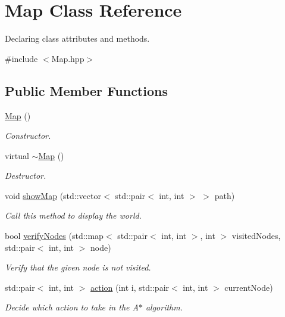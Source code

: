 \hypertarget{classMap}{}\section{Map Class Reference}
\label{classMap}


Declaring class attributes and methods.  




{\ttfamily \#include $<$Map.\+hpp$>$}

\subsection*{Public Member Functions}
\begin{DoxyCompactItemize}
\item 
\mbox{\label{classMap_a0f5ad0fd4563497b4214038cbca8b582}} 
\mbox{\hyperlink{classMap_a0f5ad0fd4563497b4214038cbca8b582}{Map}} ()
\begin{DoxyCompactList}\small\item\em Constructor. \end{DoxyCompactList}\item 
\mbox{\label{classMap_aa403fbe09394ccf39747588f5168e3b2}} 
virtual \mbox{\hyperlink{classMap_aa403fbe09394ccf39747588f5168e3b2}{$\sim$\+Map}} ()
\begin{DoxyCompactList}\small\item\em Destructor. \end{DoxyCompactList}\item 
void \mbox{\hyperlink{classMap_a9bc56eece073ec04088a94b08a57cfd6}{show\+Map}} (std\+::vector$<$ std\+::pair$<$ int, int $>$ $>$ path)
\begin{DoxyCompactList}\small\item\em Call this method to display the world. \end{DoxyCompactList}\item 
bool \mbox{\hyperlink{classMap_a1add0d83fabc9c895eddc4cae32c0ad1}{verify\+Nodes}} (std\+::map$<$ std\+::pair$<$ int, int $>$, int $>$ visited\+Nodes, std\+::pair$<$ int, int $>$ node)
\begin{DoxyCompactList}\small\item\em Verify that the given node is not visited. \end{DoxyCompactList}\item 
std\+::pair$<$ int, int $>$ \mbox{\hyperlink{classMap_a0174318a971eef891af7248906fd50e6}{action}} (int i, std\+::pair$<$ int, int $>$ current\+Node)
\begin{DoxyCompactList}\small\item\em Decide which action to take in the A$\ast$ algorithm. \end{DoxyCompactList}\end{DoxyCompactItemize}
